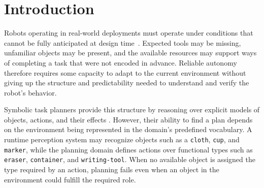 

\section{Introduction}
\label{sec:intro}

Robots operating in real-world deployments must operate under conditions that cannot be fully anticipated at design time~\cite{wray2025requirements}. Expected tools may be missing, unfamiliar objects may be present, and the available resources may support ways
of completing a task that were not encoded in advance. Reliable autonomy
therefore requires some capacity to adapt to the current environment without
giving up the structure and predictability needed to understand and verify the
robot's behavior.

Symbolic task planners provide this structure by reasoning over explicit models
of objects, actions, and their effects \cite{mcdermott1998pddl}. However, their
ability to find a plan depends on the environment being represented in the
domain's predefined vocabulary. A runtime perception system may recognize
objects such as a \texttt{cloth}, \texttt{cup}, and \texttt{marker}, while the
planning domain defines actions over functional types such as
\texttt{eraser}, \texttt{container}, and \texttt{writing-tool}. When no
available object is assigned the type required by an action, planning fails
even when an object in the environment could fulfill the required role.


